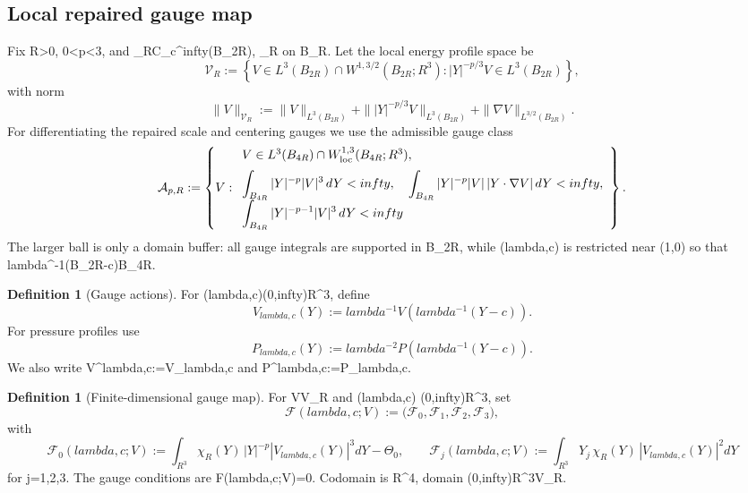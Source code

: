 \documentclass[11pt]{amsart}
\def\({}%
\def\){}%
\def\mathrm#1{#1}%
\def\mathbb#1{#1}%
\def\lambda{lambda}%
\def\infty{infty}%
\theoremstyle{plain}
\theoremstyle{definition}
\newtheorem{definition}[theorem]{Definition}
\theoremstyle{remark}
\newcommand{\dd}{\mathrm d}
\newcommand{\RR}{\mathbb R}
\newcommand{\nn}{\nabla}
\begin{document}
\subsection{Local repaired gauge map}\label{paper2:sec:gauge-map}

Fix \(R>0\), \(0<p<3\), and \(\chi_R\in C_c^\infty(B_{2R})\), \(\chi_R\) on
\(B_R\). Let the local energy profile space be
\[
\mathcal V_R:=\left\{V\in L^3(B_{2R})\cap W^{1,3/2}(B_{2R};\RR^3):
|Y|^{-p/3}V\in L^3(B_{2R})\right\},
\]
with norm
\[
\|V\|_{\mathcal V_R}:=\|V\|_{L^3(B_{2R})}
+\||Y|^{-p/3}V\|_{L^3(B_{2R})}
+\|\nn V\|_{L^{3/2}(B_{2R})}.
\]
For differentiating the repaired scale and centering gauges we use the
admissible gauge class
\[
\mathcal A_{p,R}:=\left\{V:
\begin{array}{l}
V\in L^3(B_{4R})\cap W^{1,3}_{\rm loc}(B_{4R};\RR^3),\\[2mm]
\displaystyle \int_{B_{4R}}|Y|^{-p}|V|^3\,dY<\infty,\quad
\displaystyle \int_{B_{4R}}|Y|^{-p}|V|\,|Y\cdot\nabla V|\,dY<\infty,\\[2mm]
\displaystyle \int_{B_{4R}}|Y|^{-p-1}|V|^3\,dY<\infty
\end{array}\right\}.
\]
The larger ball is only a domain buffer: all gauge integrals are supported in
\(B_{2R}\), while \((\lambda,c)\) is restricted near \((1,0)\) so that
\(\lambda^{-1}(B_{2R}-c)\subset B_{4R}\).

\begin{definition}[Gauge actions]\label{paper2:def:gauge-action}
For \((\lambda,c)\in (0,\infty)\times\RR^3\), define
\[
V_{\lambda,c}(Y):=\lambda^{-1}V(\lambda^{-1}(Y-c)).
\]
For pressure profiles use
\[
P_{\lambda,c}(Y):=\lambda^{-2}P(\lambda^{-1}(Y-c)).
\]
We also write \(V^{\lambda,c}:=V_{\lambda,c}\) and \(P^{\lambda,c}:=P_{\lambda,c}\).
\end{definition}

\begin{definition}[Finite-dimensional gauge map]\label{paper2:def:gauge-map}
For \(V\in\mathcal V_R\) and \( (\lambda,c) \in (0,\infty)\times\RR^3\), set
\[
\mathcal F(\lambda,c;V)
:=\bigl(\mathcal F_0,\mathcal F_1,\mathcal F_2,\mathcal F_3\bigr),
\]
with
\[
\mathcal F_0(\lambda,c;V):=
\int_{\RR^3}\chi_R(Y)\,|Y|^{-p}|V_{\lambda,c}(Y)|^3\dd Y-\Theta_0,\qquad
\mathcal F_j(\lambda,c;V):=\int_{\RR^3}Y_j\,\chi_R(Y)\,|V_{\lambda,c}(Y)|^2\dd Y
\]
for \(j=1,2,3\). The gauge conditions are \(\mathcal F(\lambda,c;V)=0\).
Codomain is \(\RR^4\), domain \((0,\infty)\times\RR^3\times\mathcal V_R\).
\end{definition}
\end{document}
